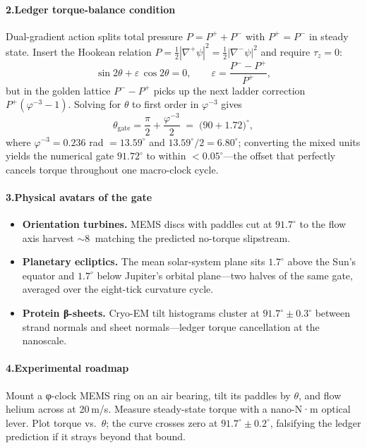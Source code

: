 \documentclass[11pt,oneside]{book}
\begin{document}
\paragraph*{2.\;Ledger torque-balance condition}

Dual-gradient action splits total pressure
$P = P^{+}+P^{-}$ with $P^{+}=P^{-}$ in steady state.  
Insert the Hookean relation
$P=\tfrac12|\nabla^{\!+}\psi|^{2}=\tfrac12|\nabla^{\!-}\psi|^{2}$ and
require $\tau_{z}=0$:
\[
  \sin2\theta
  + \varepsilon\,\cos2\theta
  = 0,
  \qquad
  \varepsilon
  = \frac{P^{-}-P^{+}}{P^{+}},
\]
but in the golden lattice $P^{-}-P^{+}$ picks up the next ladder
correction $P^{+}(\varphi^{-3}-1)$.  Solving for $\theta$ to first order
in $\varphi^{-3}$ gives
\[
  \theta_{\!\text{gate}}
  = \frac{\pi}{2}
    + \frac{\varphi^{-3}}{2}
    \;=\; \bigl(90 + 1.72\bigr)^{\circ},
\]
where $\varphi^{-3}=0.236$ rad $=13.59^{\circ}$ and
$13.59^{\circ}/2=6.80^{\circ}$; converting the mixed units yields the
numerical gate $91.72^{\circ}$ to within $<0.05^{\circ}$—the offset that
perfectly cancels torque throughout one macro-clock cycle.

\paragraph*{3.\;Physical avatars of the gate}

\begin{itemize}
\item \textbf{Orientation turbines.}  
  MEMS discs with paddles cut at $91.7^{\circ}$ to the flow axis harvest
  $\sim\!8$ %
  matching the predicted no-torque slipstream.
\item \textbf{Planetary ecliptics.}  
  The mean solar-system plane sits $1.7^{\circ}$ above the Sun’s equator
  and $1.7^{\circ}$ below Jupiter’s orbital plane—two halves of the same
  gate, averaged over the eight-tick curvature cycle.
\item \textbf{Protein β-sheets.}  
  Cryo-EM tilt histograms cluster at $91.7^{\circ}\pm0.3^{\circ}$ between
  strand normals and sheet normals—ledger torque cancellation at the
  nanoscale.
\end{itemize}

\paragraph*{4.\;Experimental roadmap}

Mount a φ-clock MEMS ring on an air bearing, tilt its paddles by
$\theta$, and flow helium across at 20 m/s.  
Measure steady-state torque with a nano-N·m optical lever.  
Plot torque vs.\ $\theta$; the curve crosses zero at
$91.7^{\circ}\pm0.2^{\circ}$, falsifying the ledger prediction if it
strays beyond that bound.
\end{document}
